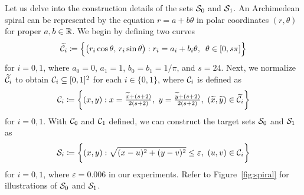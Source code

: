 \documentclass[nohyperref]{article}
\theoremstyle{plain}
\theoremstyle{definition}
\theoremstyle{remark}
\begin{document}
Let us delve into the construction details of the sets ${\mathcal{S}}_0$ and ${\mathcal{S}}_1$. An Archimedean spiral can be represented by
the equation
$r=a+b\theta$
in polar coordinates $(r,\theta)$ for proper $a,b\in\R$.
We begin by defining two curves
\begin{equation*}
	{\mathcal{\widetilde{C}}}_i\coloneqq \Big\{\big(r_i\cos\theta,\,r_i\sin\theta\big):
	   r_i=a_i+b_i\theta, \,\   
	\theta\in [0,s\pi]
	\Big\}
\end{equation*}
for $i=0,1$, where $a_0=0$, $a_1=1$, $b_0=b_1={1}/{\pi}$, and $s=24$.
Next, 
we normalize ${\mathcal{\widetilde{C}}}_i$ to obtain ${\mathcal{C}}_i\subseteq [0,1]^2$ for each $i\in\{0,1\}$, where ${\mathcal{C}}_i$ is defined as
\begin{equation*}
	{{\mathcal{C}}}_i\coloneqq \bigg\{(x,y):x=\tfrac{{\widetilde{x}}+(s+2)}{2(s+2)},\    
	y=\tfrac{{\widetilde{y}}+(s+2)}{2(s+2)},\    
	({\widetilde{x}},{\widetilde{y}})\in {\mathcal{\widetilde{C}}}_i
	\bigg\}
\end{equation*}
for $i=0,1$. 
With ${\mathcal{C}}_0$ and ${\mathcal{C}}_1$ defined, we can construct the target sets ${\mathcal{S}}_0$ and ${\mathcal{S}}_1$ as
\begin{equation*}
	{{\mathcal{S}}}_i\coloneqq \bigg\{(x,y):
	\sqrt{(x-u)^2+(y-v)^2}\le \varepsilon,\   
	(u,v)\in {{\mathcal{C}}}_i
	\bigg\}
\end{equation*}
for $i=0,1$, where $\varepsilon=0.006$ in our experiments.
Refer to Figure~\ref{fig:spiral} for illustrations of ${\mathcal{S}}_0$ and ${\mathcal{S}}_1$.
\end{document}
